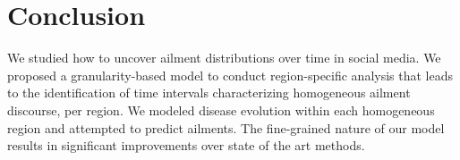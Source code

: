 \section{Conclusion}
\label{sec:conclusion}
We studied how to uncover ailment distributions over time in social
media.  We proposed a granularity-based model to conduct
region-specific analysis that leads to the identification of time
intervals characterizing homogeneous ailment discourse, per region.
We modeled disease evolution within each homogeneous
region and attempted to predict ailments.  The fine-grained nature of
our model results in significant improvements over state of the art
methods.  %
